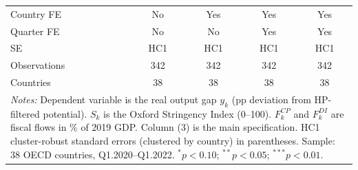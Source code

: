 \documentclass[12pt, a4paper]{article}
\begin{document}
\begin{table}[htbp]
\begin{tabular}{lcccc}
\midrule
Country FE       & No  & Yes & Yes & Yes \\
Quarter FE       & No  & No  & Yes & Yes \\
SE               & HC1 & HC1 & HC1 & HC1 \\
Observations     & 342 & 342 & 342 & 342 \\
Countries        & 38  & 38  & 38  & 38  \\
\bottomrule
\multicolumn{5}{p{12cm}}{\footnotesize \textit{Notes:} Dependent variable is the real output gap $y_k$ (pp deviation from HP-filtered potential). $S_k$ is the Oxford Stringency Index (0--100). $F^{CP}_k$ and $F^{DI}_k$ are fiscal flows in \% of 2019 GDP. Column (3) is the main specification. HC1 cluster-robust standard errors (clustered by country) in parentheses. Sample: 38 OECD countries, Q1.2020--Q1.2022. $^{*}p<0.10$; $^{**}p<0.05$; $^{***}p<0.01$.} \\
\end{tabular}
\end{table}
\end{document}
